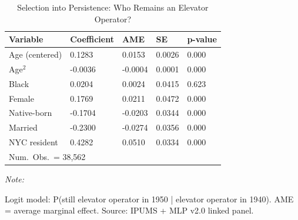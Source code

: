 \begin{table}[!h]
\centering
\caption{Selection into Persistence: Who Remains an Elevator Operator?}
\label{tab:selection_logit}
\centering
\begin{threeparttable}
\begin{tabular}[t]{lllll}
\toprule
Variable & Coefficient & AME & SE & p-value\\
\midrule
Age (centered) & 0.1283 & 0.0153 & 0.0026 & 0.000\\
Age$^2$ & -0.0036 & -0.0004 & 0.0001 & 0.000\\
Black & 0.0204 & 0.0024 & 0.0415 & 0.623\\
Female & 0.1769 & 0.0211 & 0.0472 & 0.000\\
Native-born & -0.1704 & -0.0203 & 0.0344 & 0.000\\
\addlinespace
Married & -0.2300 & -0.0274 & 0.0356 & 0.000\\
NYC resident & 0.4282 & 0.0510 & 0.0334 & 0.000\\
\midrule
\multicolumn{5}{l}{Num.\ Obs.\ = 38,562}\\
\bottomrule
\end{tabular}
\begin{tablenotes}
\item \textit{Note: } 
\item Logit model: P(still elevator operator in 1950 | elevator operator in 1940). AME = average marginal effect. Source: IPUMS + MLP v2.0 linked panel.
\end{tablenotes}
\end{threeparttable}
\end{table}
